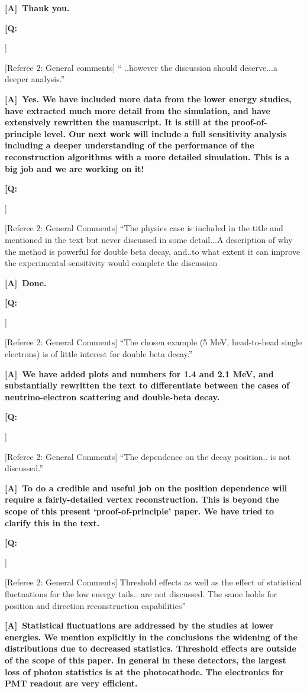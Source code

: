 \documentclass[11pt]{article}
\newcounter{question}
\newcommand{\noteq}{{\vskip0.1in\bf \large \color{red} [Q:{\color{black}\addtocounter{question}{1}\arabic{question}}]~}}
\newcommand{\notea}{{\bf \large \color{red} [A]~}}
\def \D    {Done.}
\begin{document}
\notea{\bf  Thank you.}\\ %


\noteq [Referee 2: General comments] `` ..however the discussion
should deserve...a deeper analysis.''

\notea{\bf Yes. We have included more data from the lower energy studies,
have extracted much more detail from the simulation, and have
extensively rewritten the manuscript. It is still at the
proof-of-principle level. Our next work will include a full sensitivity analysis including a deeper understanding of the performance of the reconstruction algorithms with a more detailed simulation. This is a big job and we are working on it! }\\


\noteq [Referee 2: General Comments] ``The physics case is included in
the title and mentioned in the text but never discussed in some
detail...A description of why the method is powerful for double beta
decay, and..to what extent it can improve the experimental sensitivity
would complete the discussion

\notea{\bf  \D}\\


\noteq [Referee 2: General Comments] ``The chosen example (5 MeV,
head-to-head single electrons) is of little interest for double beta decay.'' 

\notea{\bf We have added plots and numbers for 1.4 and 2.1 MeV, and
substantially rewritten the text to differentiate between the cases
of neutrino-electron scattering and double-beta decay.}\\


\noteq [Referee 2: General Comments] ``The dependence on the decay
position.. is not discussed.'' 

\notea{\bf To do a credible and useful job on the position dependence
will require a fairly-detailed vertex reconstruction. This is beyond
the scope of this present `proof-of-principle' paper. We have tried
to clarify this in the text. }\\


\noteq [Referee 2: General Comments] Threshold effects as well as the
effect of statistical fluctuations for the low energy tails.. are not
discussed. The same holds for position and direction reconstruction
capabilities'' 

\notea{\bf Statistical fluctuations are addressed by the studies at lower energies. We mention explicitly in the conclusions the widening of the distributions due to decreased statistics. Threshold effects are outside of the scope of this paper. In general in these detectors, the largest loss of photon statistics is at the photocathode. The electronics for PMT readout are very efficient. }\\
\end{document}
